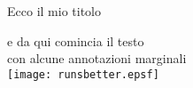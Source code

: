 \documentclass[]{slides}
\begin{document}
\begin{center}
{\large
{\color{blue} Ecco il mio titolo }
}
\end{center}

e da qui comincia il testo\\
{\tiny
con alcune annotazioni marginali
}\\
\texttt{[image: runsbetter.epsf]}
\end{document}
